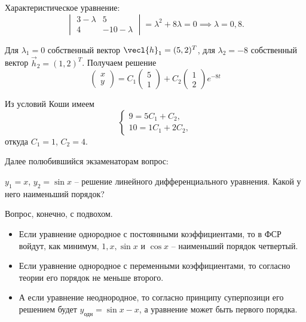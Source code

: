 Характеристическое уравнение:
\begin{equation*}
    \begin{vmatrix}
        3 - \lambda & 5 \\
        4 & -10 -\lambda
    \end{vmatrix} = \lambda^2 + 8 \lambda = 0 \implies \lambda = 0, 8.
\end{equation*}

Для $\lambda_1 = 0$ собственный вектор $\vecl{h}_1 = (5, 2)^T$, для $\lambda_2 = -8$ собственный вектор $\vec{h}_2 = (1, 2)^T$. Получаем решение
\begin{equation*}
    \begin{pmatrix}
        x \\ y
    \end{pmatrix} = C_1 \begin{pmatrix}
        5 \\ 1
    \end{pmatrix} + C_2\begin{pmatrix}
        1 \\ 2
    \end{pmatrix}e^{-8t}
\end{equation*}

Из условий Коши имеем
\begin{equation*}
    \begin{cases}
        9 = 5C_1 + C_2, \\
        10 = 1C_1 + 2C_2,
    \end{cases}
\end{equation*}
откуда $C_1 = 1$, $C_2 = 4$.

Далее полюбившийся экзаменаторам вопрос: %
\begin{task}
    $y_1 = x$, $y_2 = \sin x$ -- решение линейного дифференциального уравнения. Какой у него наименьший порядок?
\end{task}

Вопрос, конечно, с подвохом. 
\begin{itemize}
    \item Если уравнение однородное с постоянными коэффициентами, то в ФСР войдут, как минимум, $1, x, \sin x$ и $\cos x$ -- наименьший порядок четвертый.
    \item Если уравнение однородное с переменными коэффициентами, то согласно теории его порядок не меньше второго.
    \item А если уравнение неоднородное, то согласно принципу суперпозици его решением будет $y_{\text{одн}} = \sin x - x$, а уравнение может быть первого порядка.
\end{itemize}

